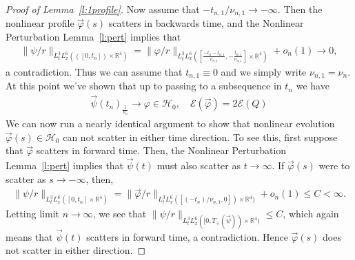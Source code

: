 \documentclass[10pt,reqno]{amsart}
\newcommand{\E}{\mathcal{E}}
\newcommand{\HH}{\mathcal{H}}
\newcommand{\LL}{\mathcal{L}}
\newcommand{\R}{\mathbb{R}}
\newcommand{\fy}{\varphi}
\newcommand{\De}{\Delta}
\newcommand{\p}{\partial}
\newcommand{\EQ}[1]{\begin{equation}\begin{split} #1 \end{split}\end{equation}}
\numberwithin{equation}{section}
\theoremstyle{remark}
\newcommand{\rdr}{ \, r \, \mathrm{d}r}
\newcommand{\0}{\emptyset}
\begin{document}
\begin{proof}[Proof of Lemma~\ref{l:1profile}]
Now assume that $-t_{n, 1}/ \nu_{n, 1} \to -\infty$. Then the nonlinear profile $\vec \fy(s)$ scatters in backwards time, and the Nonlinear Perturbation Lemma~\ref{l:pert}  implies that 
\EQ{
 \| \psi/r\|_{L^3_t L^6_x(([0,t_n]) \times \R^4)} = \| \varphi / r \|_{L^3_t L^6_x([ \frac{-t_n-t_{n, 1}}{ \nu_{n, 1}}, -\frac{t_{n, 1}}{ \nu_{n, 1}}] \times \R^4)} + o_n(1) \to 0, 
 }
 a contradiction. Thus we can assume that $ t_{n, 1}  \equiv 0$
and we simply write $\nu_{n, 1} = \nu_n$. At this point we've shown that up to passing to a subsequence in $t_n$ we have 
\EQ{
\vec \psi(t_n)_{\frac{1}{\nu_{n}}} \to \fy \in \HH_0, \quad \E(\vec \fy) = 2\E(Q)
}
We can now run a nearly identical argument to show that  nonlinear evolution $\vec \fy(s) \in \HH_0$ can not scatter in either time direction. To see this, first suppose that $\vec \fy$ scatters in forward time. Then,  the Nonlinear Perturbation Lemma~\ref{l:pert} implies that $\vec \psi(t)$ must also scatter as $t \to \infty$. If $\vec \fy(s)$ were to scatter as $s \to -\infty$, then, 
\EQ{
\| \psi/r \|_{L^3_t L^6_x([0,t_n] \times \R^4)} = \|  \vec \fy/ r \|_{L^3_t L^6_x([ (-t_n)/ \nu_{n, 1}, 0]) \times \R^4)} + o_n(1) \le C< \infty.
}
Letting limit $n \to \infty$, we see that $\| \psi /r\|_{L^3_t L^6_x([0, T_+(\vec \psi)) \times \R^4)} \le C$,  which again means that $\vec \psi(t)$ scatters in forward time, a contradiction. Hence $\vec \fy(s)$ does not scatter in either direction. 
\end{proof} 
 
 
 
 
 
 
 
 
\end{document}
